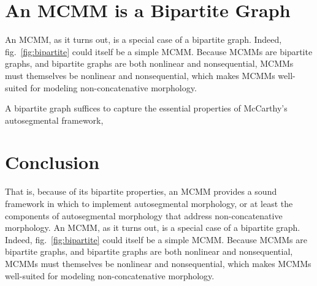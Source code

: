 
\section{An MCMM is a Bipartite Graph}\label{sec:mcmm-bipart}
An MCMM, as it turns out, is a special case of a bipartite graph. Indeed,
fig.~\ref{fig:bipartite} could itself be a simple MCMM. %
Because MCMMs are bipartite graphs, and bipartite graphs are both nonlinear and nonsequential, 
MCMMs must themselves be nonlinear and nonsequential, which makes MCMMs well-suited for modeling
non-concatenative morphology.

A bipartite graph suffices
to capture the essential properties of McCarthy's autosegmental
framework,



\section{Conclusion}
\label{sec:mcmm-bipart}

That is, because of its bipartite properties, an MCMM provides a sound framework in which to implement autosegmental morphology, or at least the components of autosegmental morphology that address non-concatenative morphology.
An MCMM, as it turns out, is a special case of a bipartite graph. Indeed,
fig.~\ref{fig:bipartite} could itself be a simple MCMM. %
Because MCMMs are bipartite graphs, and bipartite graphs are both nonlinear and nonsequential, 
MCMMs must themselves be nonlinear and nonsequential, which makes MCMMs well-suited for modeling
non-concatenative morphology.

